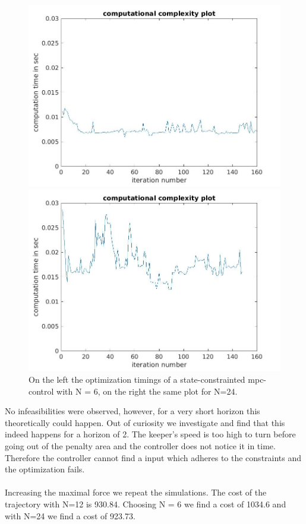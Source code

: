 \documentclass[•]{article}
\begin{document}
\begin{figure}[H]
\begin{minipage}{.45\textwidth}
\includegraphics[width = \textwidth]{comptimessconstr6.jpg}
\end{minipage}
\begin{minipage}{.45\textwidth}
\includegraphics[width = \textwidth]{comptimessconstr24.jpg}
\end{minipage}
\caption{On the left the optimization timings of a state-constrainted mpc-control with N = 6, on the right the same plot for N=24.}
\end{figure}

No infeasibilities were observed, however, for a very short horizon this theoretically could happen. Out of curiosity we investigate and find that this indeed happens for a horizon of 2. The keeper's speed is too high to turn before going out of the penalty area and the controller does not notice it in time. Therefore the controller cannot find a input which adheres to the constraints and the optimization fails. 
\\\\
Increasing the maximal force we repeat the simulations. The cost of the trajectory with N=12 is 930.84. Choosing N = 6 we find a cost of 1034.6 and with N=24 we find a cost of 923.73.
\end{document}
